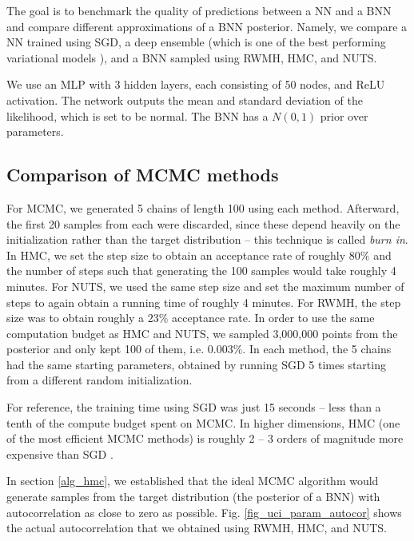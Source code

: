 \documentclass[12pt]{article}
\begin{document}
The goal is to benchmark the quality of predictions between a NN and a BNN and compare different approximations of a BNN posterior. Namely, we compare a NN trained using SGD, a deep ensemble (which is one of the best performing variational models \cite{bnn_posterior}), and a BNN sampled using RWMH, HMC, and NUTS.

We use an MLP with 3 hidden layers, each consisting of 50 nodes, and ReLU activation. The network outputs the mean and standard deviation of the likelihood, which is set to be normal. The BNN has a $N(0, 1)$ prior over parameters.

\subsection{Comparison of MCMC methods}
\label{sec_comp_mcmc}

For MCMC, we generated 5 chains of length 100 using each method. Afterward, the first 20 samples from each were discarded, since these depend heavily on the initialization rather than the target distribution -- this technique is called \textit{burn in}. In HMC, we set the step size to obtain an acceptance rate of roughly $80\%$ and the number of steps such that generating the 100 samples would take roughly 4 minutes. For NUTS, we used the same step size and set the maximum number of steps to again obtain a running time of roughly 4 minutes. For RWMH, the step size was to obtain roughly a $23\%$ acceptance rate. In order to use the same computation budget as HMC and NUTS, we sampled 3,000,000 points from the posterior and only kept 100 of them, i.e. $0.003\%$. In each method, the 5 chains had the same starting parameters, obtained by running SGD 5 times starting from a different random initialization.

For reference, the training time using SGD was just 15 seconds -- less than a tenth of the compute budget spent on MCMC. In higher dimensions, HMC (one of the most efficient MCMC methods) is roughly 2 -- 3 orders of magnitude more expensive than SGD \cite{bnn_posterior}.

In section \ref{alg_hmc}, we established that the ideal MCMC algorithm would generate samples from the target distribution (the posterior of a BNN) with autocorrelation as close to zero as possible. Fig. \ref{fig_uci_param_autocor} shows the actual autocorrelation that we obtained using RWMH, HMC, and NUTS.
\end{document}
